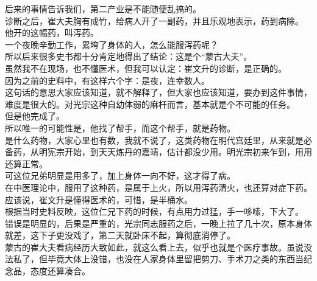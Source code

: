 \begin{multicols}{\theparacolNo}
后来的事情告诉我们，第二产业是不能随便乱搞的。\\

诊断之后，崔大夫胸有成竹，给病人开了一副药，并且乐观地表示，药到病除。\\

他开的这幅药，叫泻药。\\

一个夜晚辛勤工作，累垮了身体的人，怎么能服泻药呢？\\

所以后来很多史书都十分肯定地得出了结论：这是个“蒙古大夫”。\\

虽然我不在现场，也不懂医术，但我可以认定：崔文升的诊断，是正确的。\\

因为之前的史料中，有这样六个字：是夜，连幸数人。\\

这句话的意思大家应该知道，就不解释了，但大家也应该知道，要办到这件事情，难度是很大的。对光宗这种自幼体弱的麻杆而言，基本就是个不可能的任务。\\

但是他完成了。\\

所以唯一的可能性是，他找了帮手，而这个帮手，就是药物。\\

是什么药物，大家心里也有数，我就不说了，这类药物在明代宫廷里，从来就是必备药，从明宪宗开始，到天天炼丹的嘉靖，估计都没少用。明光宗初来乍到，用用还算正常。\\

可这位兄弟明显是用多了，加上身体一向不好，这才得了病。\\

在中医理论中，服用了这种药，是属于上火，所以用泻药清火，也还算对症下药。\\

应该说，崔文升是懂得医术的，可惜，是半桶水。\\

根据当时史料反映，这位仁兄下药的时候，有点用力过猛，手一哆嗦，下大了。\\

错误是明显的，后果是严重的，光宗同志服药之后，一晚上拉了几十次，原本身体就差，这下子更没戏了，第二天就卧床不起，算彻底消停了。\\

蒙古的崔大夫看病经历大致如此，就这么看上去，似乎也就是个医疗事故。虽说没法私了，但毕竟大体上没错，也没在人家身体里留把剪刀、手术刀之类的东西当纪念品，态度还算凑合。\\


\end{multicols}
